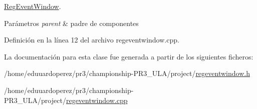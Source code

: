 \hyperlink{class_reg_event_window}{Reg\+Event\+Window}. 


\begin{DoxyParams}{Parámetros}
{\em parent} & padre de componentes \\
\hline
\end{DoxyParams}


Definición en la línea 12 del archivo regeventwindow.\+cpp.



La documentación para esta clase fue generada a partir de los siguientes ficheros\+:\begin{DoxyCompactItemize}
\item 
/home/eduuardoperez/pr3/championship-\/\+P\+R3\+\_\+\+U\+L\+A/project/\hyperlink{regeventwindow_8h}{regeventwindow.\+h}\item 
/home/eduuardoperez/pr3/championship-\/\+P\+R3\+\_\+\+U\+L\+A/project/\hyperlink{regeventwindow_8cpp}{regeventwindow.\+cpp}\end{DoxyCompactItemize}
